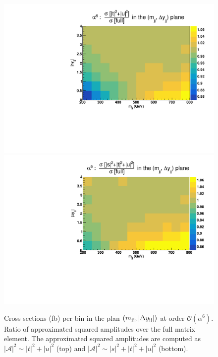 \begin{figure}[hbt]
\centering
\includegraphics[scale=0.395]{figures/scanfigures/ratio_tu.pdf}
\includegraphics[scale=0.395]{figures/scanfigures/ratio_stu.pdf}
\caption{Cross sections (fb) per bin in the plan $\left(m_{\text{j}\text{j}}, |\Delta y_{\text{j}\text{j}}| \right)$ at order $\mathcal{O}(\alpha^6)$.
Ratio of approximated squared amplitudes over the full matrix element. The approximated squared amplitudes are computed as $|\mathcal{A}|^2 \sim |t|^2 + |u|^2$ (top) and $|\mathcal{A}|^2 \sim |s|^2 + |t|^2 + |u|^2$ (bottom).} 
\label{fig:ratio2d_LO}
\end{figure}
